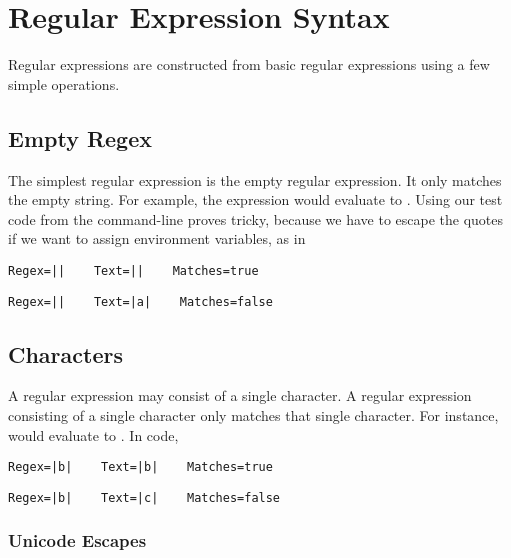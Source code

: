 \section{Regular Expression Syntax}

Regular expressions are constructed from basic regular expressions
using a few simple operations.  

\subsection{Empty Regex}

The simplest regular expression is the empty regular expression.  It
only matches the empty string.  For example, the expression
 would evaluate to
.  Using our test code from the command-line proves tricky,
because we have to escape the quotes if we want to assign environment
variables, as in 
%
\begin{verbatim}
Regex=||    Text=||    Matches=true
\end{verbatim}
%
\begin{verbatim}
Regex=||    Text=|a|    Matches=false
\end{verbatim}


\subsection{Characters}

A regular expression may consist of a single character.  A regular
expression consisting of a single character only matches that single
character.  For instance,
 would evaluate to
.  In code, 
%
\begin{verbatim}
Regex=|b|    Text=|b|    Matches=true
\end{verbatim}
%
\begin{verbatim}
Regex=|b|    Text=|c|    Matches=false
\end{verbatim}

\subsubsection{Unicode Escapes}

